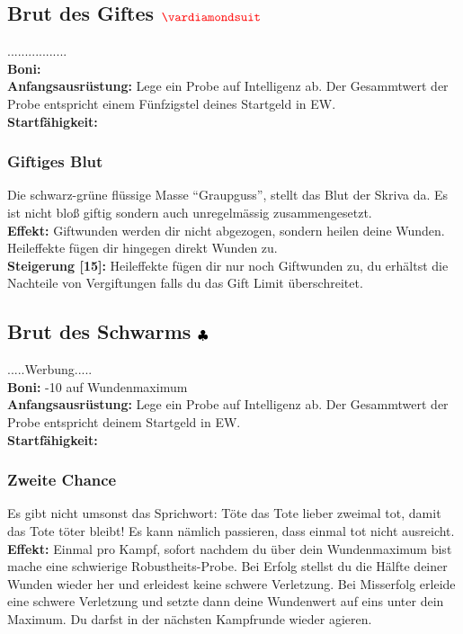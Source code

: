 \subsection*{Brut des Giftes $\Karo{}$}
.................\\
\textbf{Boni:} \\
\textbf{Anfangsausrüstung:} Lege ein Probe auf Intelligenz ab. Der Gesammtwert der Probe entspricht einem Fünfzigstel deines Startgeld in EW. \\
\textbf{Startfähigkeit:}  \\

\subsubsection*{Giftiges Blut} \label{sk:giftiges_blut}
Die schwarz-grüne flüssige Masse “Graupguss”, stellt das Blut der Skriva da. Es ist nicht bloß giftig sondern auch unregelmässig zusammengesetzt. \\
\textbf{Effekt:} Giftwunden werden dir nicht abgezogen, sondern heilen deine Wunden. Heileffekte fügen dir hingegen direkt Wunden zu.\\
\textbf{Steigerung [15]:} Heileffekte fügen dir nur noch Giftwunden zu, du erhältst die Nachteile von Vergiftungen falls du das Gift Limit überschreitet.


\subsection*{Brut des Schwarms ${\color{blue} }{\color{black}\clubsuit}$}
.....Werbung.....\\
\textbf{Boni:}  -10 auf Wundenmaximum\\
\textbf{Anfangsausrüstung:} Lege ein Probe auf Intelligenz ab. Der Gesammtwert der Probe entspricht deinem Startgeld in EW.\\
\textbf{Startfähigkeit:}  \\

\subsubsection*{Zweite Chance} \label{sk:zweite_chance}
Es gibt nicht umsonst das Sprichwort: Töte das Tote lieber zweimal tot, damit das Tote töter bleibt! Es kann nämlich passieren, dass einmal tot nicht ausreicht.\\
\textbf{Effekt:} Einmal pro Kampf, sofort nachdem du über dein Wundenmaximum bist mache eine schwierige Robustheits-Probe. Bei Erfolg stellst du die Hälfte deiner Wunden wieder her und erleidest keine schwere Verletzung. Bei Misserfolg erleide eine schwere Verletzung und setzte dann deine Wundenwert auf eins unter dein Maximum. Du darfst in der nächsten Kampfrunde wieder agieren.

